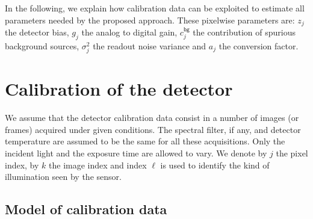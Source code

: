 \documentclass[a4paper,11pt,twoside]{scrartcl}
\newcommand*{\Tag}[1]{\mathsf{#1}}
\theoremstyle{plain} %
\theoremstyle{definition}
\theoremstyle{remark}
\begin{document}
In the following, we explain how calibration data can be exploited to estimate all
parameters needed by the proposed approach.  These pixelwise parameters are:
$z_j$ the detector bias, $g_j$ the analog to digital gain, $c^\Tag{bg}_j$ the
contribution of spurious background sources, $\sigma_j^2$ the readout noise
variance and $a_j$ the conversion factor.


\section{Calibration of the detector}

We assume that the detector calibration data consist in a number of images (or
frames) acquired under given conditions.  The spectral filter, if any, and
detector temperature are assumed to be the same for all these acquisitions.
Only the incident light and the exposure time are allowed to vary.  We denote
by $j$ the pixel index, by $k$ the image index and index $\ell$ is used to
identify the kind of illumination seen by the sensor.


\subsection{Model of calibration data}
\label{sec:calibration-data-model}
\end{document}
